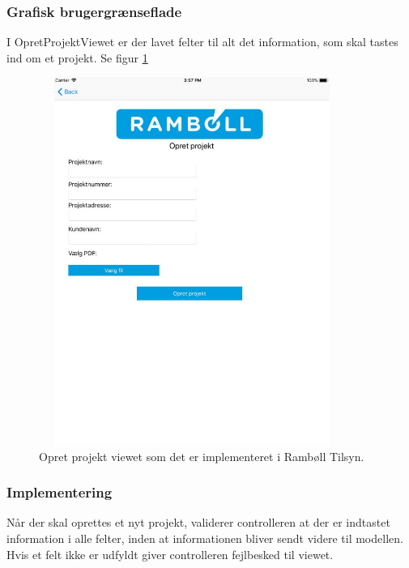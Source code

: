 \subsubsection{Grafisk brugergrænseflade}
I OpretProjektViewet er der lavet felter til alt det information, som skal tastes ind om et projekt. Se figur \ref{fig:OpretProjektView}
\begin{figure}[H] %
	\centering
	\includegraphics[height=12cm, width=10cm]{../ArkitekturDesign/Design/OpretProjekt/OpretProjektView}
	\caption{Opret projekt viewet som det er implementeret i Rambøll Tilsyn.}
	\label{fig:OpretProjektView}
\end{figure}

\subsubsection{Implementering}
Når der skal oprettes et nyt projekt, validerer controlleren at der er indtastet information i alle felter,
inden at informationen bliver sendt videre til modellen. Hvis et felt ikke er udfyldt giver controlleren fejlbesked til viewet. \\

\clearpage